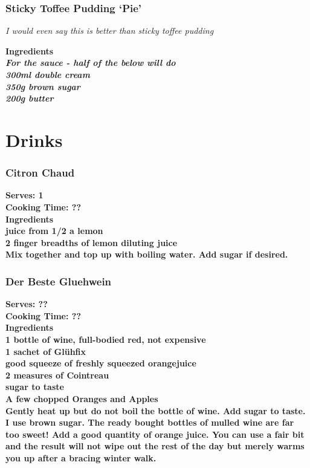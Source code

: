\documentclass[18pt, oneside]{book}
\begin{document}
\section{Sticky Toffee Pudding `Pie'}
\it{I would even say this is better than sticky toffee pudding}

\bf{Ingredients} \normalfont \\

\it{For the sauce - half of the below will do} \\
300ml double cream \\
350g brown sugar \\
200g butter \\

 
\part{Drinks}

\section{Citron Chaud}
\bf{Serves: 1} \\
\bf{Cooking Time: ??} \\

\bf{Ingredients} \normalfont \\ 
juice from 1/2 a lemon \\
2 finger breadths of lemon diluting juice \\

Mix together and top up with boiling water. Add sugar if desired. 

\section{Der Beste Gluehwein}
\bf{Serves: ??} \\
\bf{Cooking Time: ??} \\

\bf{Ingredients} \normalfont \\ 
1 bottle of wine, full-bodied red, not expensive \\
1 sachet of Gl\"{u}hfix \\
good squeeze of freshly squeezed orangejuice \\
2 measures of Cointreau \\ 
sugar to taste \\
A few chopped Oranges and Apples \\

Gently heat up but do not boil the bottle of wine. Add sugar to taste. I use brown sugar. The ready bought bottles of mulled wine are far too sweet! Add a good quantity of orange juice. You can use a fair bit and the result will not wipe out the rest of the day but merely warms you up after a bracing winter walk. \\
\end{document}
